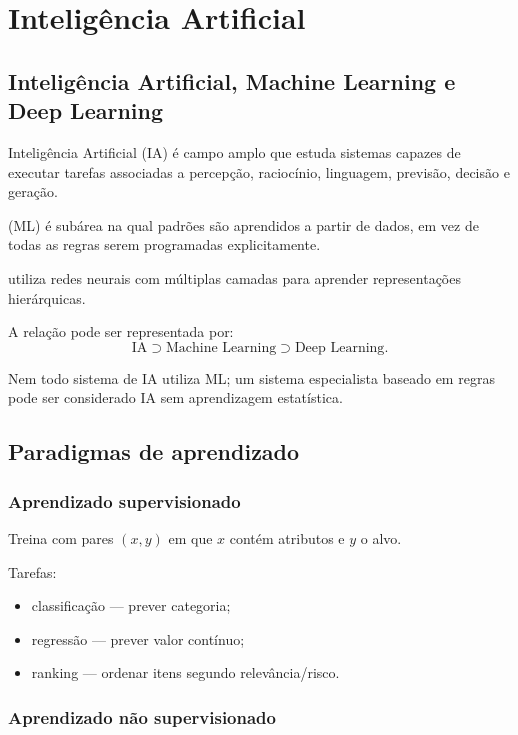 \chapter{Inteligência Artificial}

\section{Inteligência Artificial, Machine Learning e Deep Learning}

Inteligência Artificial (IA) é campo amplo que estuda sistemas capazes de executar tarefas associadas a percepção, raciocínio, linguagem, previsão, decisão e geração.

 (ML) é subárea na qual padrões são aprendidos a partir de dados, em vez de todas as regras serem programadas explicitamente.

 utiliza redes neurais com múltiplas camadas para aprender representações hierárquicas.

A relação pode ser representada por:
\[
\text{IA}\supset\text{Machine Learning}\supset\text{Deep Learning}.
\]

Nem todo sistema de IA utiliza ML; um sistema especialista baseado em regras pode ser considerado IA sem aprendizagem estatística.

\section{Paradigmas de aprendizado}

\subsection{Aprendizado supervisionado}

Treina com pares $(x,y)$ em que $x$ contém atributos e $y$ o alvo.

Tarefas:
\begin{itemize}
\item classificação — prever categoria;
\item regressão — prever valor contínuo;
\item ranking — ordenar itens segundo relevância/risco.
\end{itemize}

\subsection{Aprendizado não supervisionado}

